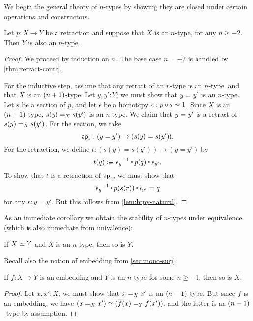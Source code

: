 We begin the general theory of $n$-types by showing they are closed under certain operations and constructors.

\begin{thm}\label{thm:h-level-retracts}
 Let $p : X \to Y$ be a retraction and suppose that $X$ is an $n$-type, for any $n\geq -2$.
 Then $Y$ is also an $n$-type.
\end{thm}

\begin{proof}
 We proceed by induction on $n$.
 The base case $n=-2$ is handled by \autoref{thm:retract-contr}.

 For the inductive step, assume that any retract of an $n$-type is an $n$-type, and that $X$ is an $\nplusone$-type.
 Let $y, y' : Y$; we must show that $\id{y}{y'}$ is an $n$-type.
 Let $s$ be a section of $p$, and let $\epsilon$ be a homotopy $\epsilon : p \circ s \htpy 1$.
 Since $X$ is an $\nplusone$-type, $\id[X]{s(y)}{s(y')}$ is an $n$-type.
 We claim that $\id{y}{y'}$ is a retract of $\id[X]{s(y)}{s(y')}$.
 For the section, we take
 \[ \apfunc s : (y=y') \to (s(y)=s(y')). \]
 For the retraction, we define $t:(s(y)=s(y'))\to(y=y')$ by
 \[ t(q) \defeq  \opp{\epsilon_y} \ct \ap p q \ct \epsilon_{y'}.\]
 To show that $t$ is a retraction of $\apfunc s$, we must show that
 \[ \opp{\epsilon_y} \ct \ap p {\ap sr} \ct \epsilon_{y'} = q \]
 for any $r:y=y'$.
 But this follows from \autoref{lem:htpy-natural}.
\end{proof}

As an immediate corollary we obtain the stability of $n$-types under equivalence (which is also immediate from univalence):

\begin{cor}\label{cor:preservation-hlevels-weq}
 If $\eqv{X}{Y}$ and $X$ is an $n$-type, then so is $Y$.
\end{cor}

Recall also the notion of embedding from \autoref{sec:mono-surj}.

\begin{thm}\label{thm:isntype-mono}
  If $f:X\to Y$ is an embedding and $Y$ is an $n$-type for some $n\ge -1$, then so is $X$.
\end{thm}
\begin{proof}
  Let $x,x':X$; we must show that $\id[X]{x}{x'}$ is an $\nminusone$-type.
  But since $f$ is an embedding, we have $(\id[X]{x}{x'}) \eqvsym (\id[Y]{f(x)}{f(x')})$, and the latter is an $\nminusone$-type by assumption.
\end{proof}

